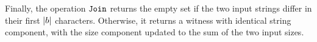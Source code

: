 Finally, the operation $\texttt{Join}$ returns the empty set if the two input strings differ in their first $|b|$ characters. Otherwise, it returns a witness with identical string component, with the size component updated to the sum of the two input sizes.

